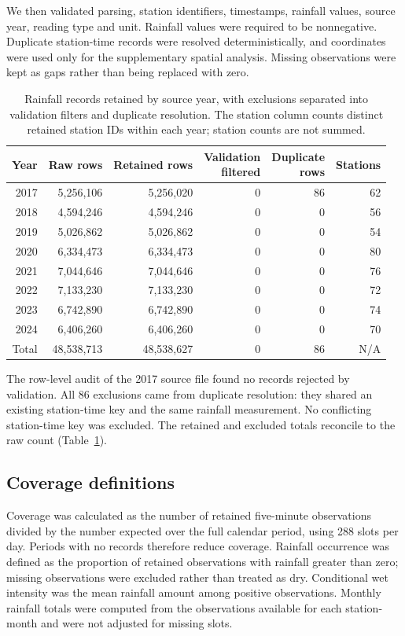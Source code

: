 \documentclass[11pt,a4paper]{article}
\begin{document}
We then validated parsing, station identifiers, timestamps, rainfall values,
source year, reading type and unit. Rainfall values were required to be
nonnegative. Duplicate station-time records were resolved deterministically,
and coordinates were used only for the supplementary spatial analysis.
Missing observations were kept as gaps rather than being replaced with zero.

\begin{table}[htbp]
\centering\small
\caption{Rainfall records retained by source year, with exclusions separated
into validation filters and duplicate resolution. The station column counts
distinct retained station IDs within each year; station counts are not summed.}
\label{tab:cleaning}
\begin{tabular}{r r r r r r}
\toprule
Year & Raw rows & Retained rows & \shortstack{Validation\\filtered} & \shortstack{Duplicate\\rows} & Stations \\
\midrule
2017 & 5,256,106 & 5,256,020 & 0 & 86 & 62 \\
2018 & 4,594,246 & 4,594,246 & 0 & 0 & 56 \\
2019 & 5,026,862 & 5,026,862 & 0 & 0 & 54 \\
2020 & 6,334,473 & 6,334,473 & 0 & 0 & 80 \\
2021 & 7,044,646 & 7,044,646 & 0 & 0 & 76 \\
2022 & 7,133,230 & 7,133,230 & 0 & 0 & 72 \\
2023 & 6,742,890 & 6,742,890 & 0 & 0 & 74 \\
2024 & 6,406,260 & 6,406,260 & 0 & 0 & 70 \\
\midrule
Total & 48,538,713 & 48,538,627 & 0 & 86 & N/A \\
\bottomrule
\end{tabular}
\end{table}

The row-level audit of the 2017 source file found no records rejected by
validation. All 86 exclusions came from duplicate resolution: they shared an
existing station-time key and the same rainfall measurement. No conflicting
station-time key was excluded. The retained and excluded totals reconcile to
the raw count (Table~\ref{tab:cleaning}).

\subsection{Coverage definitions}
Coverage was calculated as the number of retained five-minute observations
divided by the number expected over the full calendar period, using 288 slots
per day. Periods with no records therefore reduce coverage. Rainfall occurrence
was defined as the proportion of retained observations with rainfall greater
than zero; missing observations were excluded rather than treated as dry.
Conditional wet intensity was the mean rainfall amount among positive
observations. Monthly rainfall totals were computed from the observations
available for each station-month and were not adjusted for missing slots.
\end{document}
